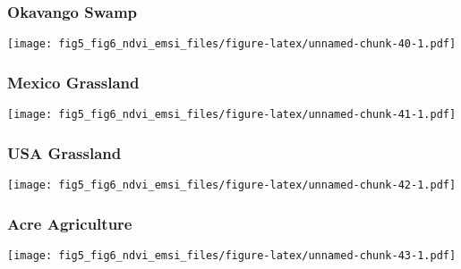 \documentclass[
]{article}
\begin{document}
\hypertarget{htmlwidget-ddd8eb5b5c51c3f8f527}{}
\begin{plotly}

\end{plotly}

\hypertarget{okavango-swamp-2}{%
\subsubsection{Okavango Swamp}\label{okavango-swamp-2}}

\texttt{[image: fig5\_fig6\_ndvi\_emsi\_files/figure-latex/unnamed-chunk-40-1.pdf]}

\hypertarget{htmlwidget-a9a424091c47fc9ffa81}{}
\begin{plotly}

\end{plotly}

\hypertarget{mexico-grassland-1}{%
\subsubsection{Mexico Grassland}\label{mexico-grassland-1}}

\texttt{[image: fig5\_fig6\_ndvi\_emsi\_files/figure-latex/unnamed-chunk-41-1.pdf]}

\hypertarget{htmlwidget-04de02b040be5f09cd6a}{}
\begin{plotly}

\end{plotly}

\hypertarget{usa-grassland-1}{%
\subsubsection{USA Grassland}\label{usa-grassland-1}}

\texttt{[image: fig5\_fig6\_ndvi\_emsi\_files/figure-latex/unnamed-chunk-42-1.pdf]}

\hypertarget{htmlwidget-0e026846a385bb3a79ac}{}
\begin{plotly}

\end{plotly}

\hypertarget{acre-agriculture-2}{%
\subsubsection{Acre Agriculture}\label{acre-agriculture-2}}

\texttt{[image: fig5\_fig6\_ndvi\_emsi\_files/figure-latex/unnamed-chunk-43-1.pdf]}
\end{document}
